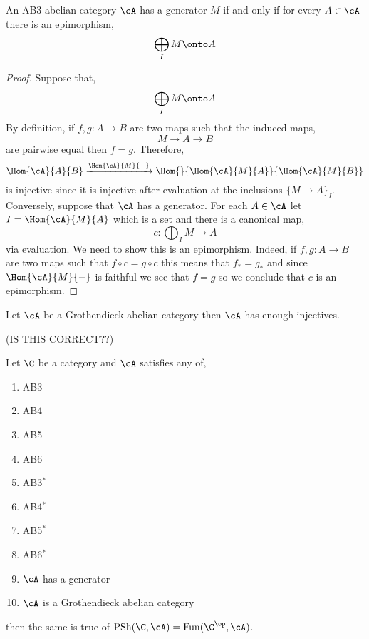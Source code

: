 \documentclass[12pt]{article}
\begin{document}
\begin{lemma}
An AB3 abelian category $\cA$ has a generator $M$ if and only if for every $A \in \cA$ there is an epimorphism,
\[ \bigoplus_I M \onto A \]
\end{lemma}

\begin{proof}
Suppose that,
\[ \bigoplus_I M \onto A \]
By definition, if $f,g : A \to B$ are two maps such that the induced maps,
\[ M \to A \to B \]
are pairwise equal then $f = g$. Therefore,
\[ \Hom{\cA}{A}{B} \xrightarrow{\Hom{\cA}{M}{-}} \Hom{}{\Hom{\cA}{M}{A}}{\Hom{\cA}{M}{B}} \]
is injective since it is injective after evaluation at the inclusions $\{ M \to A \}_I$.
\bigskip\\
Conversely, suppose that $\cA$ has a generator. For each $A \in \cA$ let $I = \Hom{\cA}{M}{A}$ which is a set and there is a canonical map,
\[ c : \bigoplus_I M \to A \]
via evaluation. We need to show this is an epimorphism. Indeed, if $f, g : A \to B$ are two maps such that $f \circ c = g \circ c$ this means that $f_* = g_*$ and since $\Hom{\cA}{M}{-}$ is faithful we see that $f = g$ so we conclude that $c$ is an epimorphism.  
\end{proof}

\begin{theorem}[1.10.1 in T\^{o}hoku] 
Let $\cA$ be a Grothendieck abelian category then $\cA$ has enough injectives.
\end{theorem}

\newcommand{\PSh}{\mathrm{PSh}}

(IS THIS CORRECT??)

\begin{prop}
Let $\C$ be a category and $\cA$ satisfies any of,
\begin{enumerate}
\item AB3
\item AB4
\item AB5
\item AB6
\item AB3$^*$
\item AB4$^*$
\item AB5$^*$
\item AB6$^*$
\item $\cA$ has a generator
\item $\cA$ is a Grothendieck abelian category 
\end{enumerate} 
then the same is true of $\PSh(\C, \cA) = \mathrm{Fun}(\C^\op, \cA)$.
\end{prop}
\end{document}
